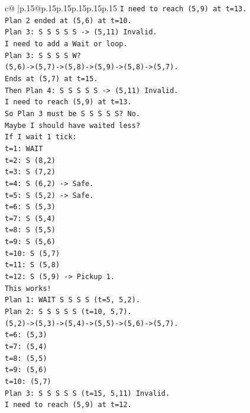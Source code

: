 \documentclass{article}
\begin{document}
{\begin{supertabular}{c@{$\;$}|p{.15\linewidth}@{}p{.15\linewidth}p{.15\linewidth}p{.15\linewidth}p{.15\linewidth}p{.15\linewidth}}
{{{\texttt{I need to reach (5,9) at t=13.} \\
\texttt{Plan 2 ended at (5,6) at t=10.} \\
\texttt{Plan 3: S S S S S {-}> (5,11) Invalid.} \\
\texttt{I need to add a Wait or loop.} \\
\texttt{Plan 3: S S S S W?} \\
\texttt{(5,6){-}>(5,7){-}>(5,8){-}>(5,9){-}>(5,8){-}>(5,7).} \\
\texttt{Ends at (5,7) at t=15.} \\
\texttt{Then Plan 4: S S S S S {-}> (5,11) Invalid.} \\
\texttt{I need to reach (5,9) at t=13.} \\
\texttt{So Plan 3 must be S S S S S? No.} \\
\texttt{Maybe I should have waited less?} \\
\texttt{If I wait 1 tick:} \\
\texttt{t=1: WAIT} \\
\texttt{t=2: S (8,2)} \\
\texttt{t=3: S (7,2)} \\
\texttt{t=4: S (6,2) {-}> Safe.} \\
\texttt{t=5: S (5,2) {-}> Safe.} \\
\texttt{t=6: S (5,3)} \\
\texttt{t=7: S (5,4)} \\
\texttt{t=8: S (5,5)} \\
\texttt{t=9: S (5,6)} \\
\texttt{t=10: S (5,7)} \\
\texttt{t=11: S (5,8)} \\
\texttt{t=12: S (5,9) {-}> Pickup 1.} \\
\texttt{This works!} \\
\texttt{Plan 1: WAIT S S S S (t=5, 5,2).} \\
\texttt{Plan 2: S S S S S (t=10, 5,7).} \\
\texttt{(5,2){-}>(5,3){-}>(5,4){-}>(5,5){-}>(5,6){-}>(5,7).} \\
\texttt{t=6: (5,3)} \\
\texttt{t=7: (5,4)} \\
\texttt{t=8: (5,5)} \\
\texttt{t=9: (5,6)} \\
\texttt{t=10: (5,7)} \\
\texttt{Plan 3: S S S S S (t=15, 5,11) Invalid.} \\
\texttt{I need to reach (5,9) at t=12.} \\
}}}
\end{supertabular}}
\end{document}
